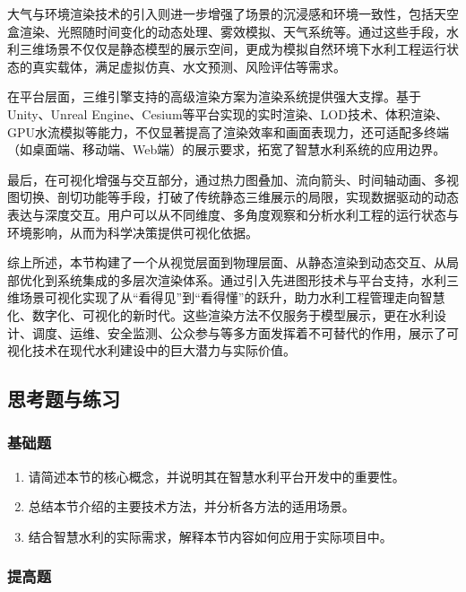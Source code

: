 大气与环境渲染技术的引入则进一步增强了场景的沉浸感和环境一致性，包括天空盒渲染、光照随时间变化的动态处理、雾效模拟、天气系统等。通过这些手段，水利三维场景不仅仅是静态模型的展示空间，更成为模拟自然环境下水利工程运行状态的真实载体，满足虚拟仿真、水文预测、风险评估等需求。

在平台层面，三维引擎支持的高级渲染方案为渲染系统提供强大支撑。基于Unity、Unreal Engine、Cesium等平台实现的实时渲染、LOD技术、体积渲染、GPU水流模拟等能力，不仅显著提高了渲染效率和画面表现力，还可适配多终端（如桌面端、移动端、Web端）的展示要求，拓宽了智慧水利系统的应用边界。

最后，在可视化增强与交互部分，通过热力图叠加、流向箭头、时间轴动画、多视图切换、剖切功能等手段，打破了传统静态三维展示的局限，实现数据驱动的动态表达与深度交互。用户可以从不同维度、多角度观察和分析水利工程的运行状态与环境影响，从而为科学决策提供可视化依据。

综上所述，本节构建了一个从视觉层面到物理层面、从静态渲染到动态交互、从局部优化到系统集成的多层次渲染体系。通过引入先进图形技术与平台支持，水利三维场景可视化实现了从``看得见''到``看得懂''的跃升，助力水利工程管理走向智慧化、数字化、可视化的新时代。这些渲染方法不仅服务于模型展示，更在水利设计、调度、运维、安全监测、公众参与等多方面发挥着不可替代的作用，展示了可视化技术在现代水利建设中的巨大潜力与实际价值。

\hypertarget{ux601dux8003ux9898ux4e0eux7ec3ux4e60-6}{%
\subsection{思考题与练习}\label{ux601dux8003ux9898ux4e0eux7ec3ux4e60-6}}

\hypertarget{ux57faux7840ux9898-6}{%
\subsubsection{基础题}\label{ux57faux7840ux9898-6}}

\begin{enumerate}
\def\labelenumi{\arabic{enumi}.}
\tightlist
\item
  请简述本节的核心概念，并说明其在智慧水利平台开发中的重要性。
\item
  总结本节介绍的主要技术方法，并分析各方法的适用场景。
\item
  结合智慧水利的实际需求，解释本节内容如何应用于实际项目中。
\end{enumerate}

\hypertarget{ux63d0ux9ad8ux9898-6}{%
\subsubsection{提高题}\label{ux63d0ux9ad8ux9898-6}}

